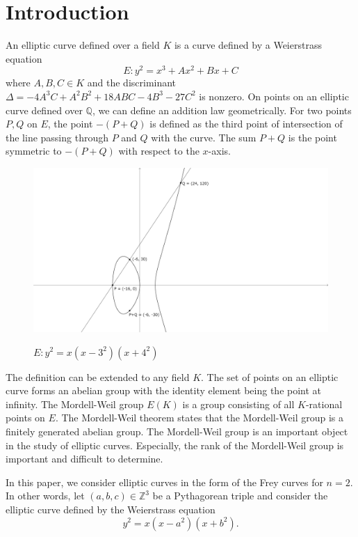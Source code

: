 \documentclass[a4paper]{jarticle} %
\theoremstyle{definition}
\theoremstyle{remark}
\begin{document}
\section{Introduction}
An elliptic curve defined over a field $K$ is a curve defined by a Weierstrass equation
\begin{equation*}
    E: y^{2} = x^{3} + Ax^2 + Bx + C
\end{equation*}
where $A,B,C \in K$ and the discriminant $\Delta = -4A^3C + A^2B^2 + 18ABC - 4B^3 - 27C^2$ is nonzero.
On points on an elliptic curve defined over $\mathbb{Q}$, we can define an addition law geometrically.
For two points $P,Q$ on $E$, the point $-(P+Q)$ is defined as the third point of intersection of the line passing through $P$ and $Q$ with the curve.
The sum $P+Q$ is the point symmetric to $-(P+Q)$ with respect to the $x$-axis.
\begin{figure}[ht]
    \centering
    \caption{$E: y^2 = x(x-3^2)(x+4^2)$}
    \includegraphics[keepaspectratio, width=\linewidth]{figures/3-4-5.png}
    \label{fig:elliptic_curve}
\end{figure}

The definition can be extended to any field $K$.
The set of points on an elliptic curve forms an abelian group with the identity element being the point at infinity.
The Mordell-Weil group $E(K)$ is a group consisting of all $K$-rational points on $E$.
The Mordell-Weil theorem states that the Mordell-Weil group is a finitely generated abelian group.
The Mordell-Weil group is an important object in the study of elliptic curves.
Especially, the rank of the Mordell-Weil group is important and difficult to determine.

In this paper, we consider elliptic curves in the form of the Frey curves for $n=2$.
In other words, let $(a,b,c) \in \mathbb{Z}^3$ be a Pythagorean triple and consider the elliptic curve defined by the Weierstrass equation
\begin{equation}
    \label{eq:2frey}
    y^{2} = x(x - a^{2})(x + b^{2}).
\end{equation}
\end{document}

